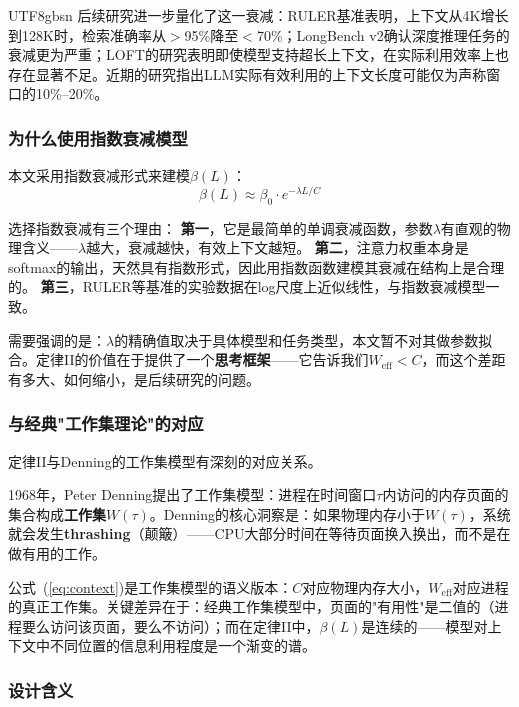\documentclass[11pt,a4paper]{article}
\begin{document}
\begin{CJK*}{UTF8}{gbsn}
后续研究进一步量化了这一衰减：RULER基准表明，上下文从4K增长到128K时，检索准确率从$>$95\%降至$<$70\%\cite{ruler2024}；LongBench v2确认深度推理任务的衰减更为严重\cite{longbenchv2_2024}；LOFT的研究表明即使模型支持超长上下文，在实际利用效率上也存在显著不足\cite{loft2024}。近期的研究指出LLM实际有效利用的上下文长度可能仅为声称窗口的10\%--20\%。

\subsubsection{为什么使用指数衰减模型}

本文采用指数衰减形式来建模$\beta(L)$：
\begin{equation}
\beta(L) \approx \beta_0 \cdot e^{-\lambda L / C}
\end{equation}

选择指数衰减有三个理由：
\textbf{第一}，它是最简单的单调衰减函数，参数$\lambda$有直观的物理含义——$\lambda$越大，衰减越快，有效上下文越短。
\textbf{第二}，注意力权重本身是softmax的输出，天然具有指数形式，因此用指数函数建模其衰减在结构上是合理的。
\textbf{第三}，RULER等基准的实验数据在log尺度上近似线性\cite{ruler2024}，与指数衰减模型一致。

需要强调的是：$\lambda$的精确值取决于具体模型和任务类型，本文暂不对其做参数拟合。定律II的价值在于提供了一个\textbf{思考框架}——它告诉我们$W_{\mathrm{eff}} < C$，而这个差距有多大、如何缩小，是后续研究的问题。

\subsubsection{与经典"工作集理论"的对应}

定律II与Denning的工作集模型有深刻的对应关系\cite{denning1968thrashing}。

1968年，Peter Denning提出了工作集模型：进程在时间窗口$\tau$内访问的内存页面的集合构成\textbf{工作集}$W(\tau)$。Denning的核心洞察是：如果物理内存小于$W(\tau)$，系统就会发生\textbf{thrashing}（颠簸）——CPU大部分时间在等待页面换入换出，而不是在做有用的工作\cite{denning1968thrashing,denning2020workingset}。

公式~(\ref{eq:context})是工作集模型的语义版本：$C$对应物理内存大小，$W_{\mathrm{eff}}$对应进程的真正工作集。关键差异在于：经典工作集模型中，页面的"有用性"是二值的（进程要么访问该页面，要么不访问）；而在定律II中，$\beta(L)$是连续的——模型对上下文中不同位置的信息利用程度是一个渐变的谱。

\subsubsection{设计含义}


\end{CJK*}
\end{document}
